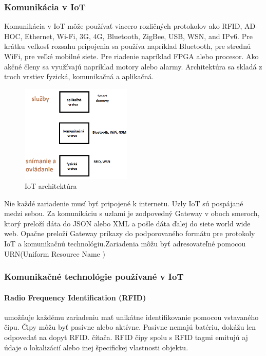 \documentclass[../../main.tex]{subfiles}
\begin{document}
\subsubsection{Komunikácia v IoT}
Komunikácia v IoT môže používať viacero rozličných protokolov ako RFID, AD-HOC, Ethernet, Wi-Fi, 3G, 4G, Bluetooth, ZigBee, USB, WSN, and IPv6. Pre krátku veľkosť rozsahu pripojenia sa používa napríklad Bluetooth, pre strednú WiFi, pre veľké mobilné siete.
Pre riadenie napríklad FPGA alebo procesor. Ako akčné členy sa využívajú napríklad motory alebo alarmy. Architektúra sa skladá z troch vrstiev fyzická, komunikačná a aplikačná. \cite{springerprofessional.de_The_Era_of_IoT} 

\begin{figure}
    \centering
  \includegraphics[width=0.47\textwidth]{images/IoT_vrstvy.png}
  \caption{IoT architektúra\cite{springerprofessional.de_The_Era_of_IoT}}
\end{figure} 
Nie každé zariadenie musí byť pripojené k internetu. Uzly IoT sú pospájané medzi sebou. Za komunikáciu s uzlami je zodpovedný Gateway v oboch smeroch, ktorý preloží dáta do JSON alebo XML a pošle dáta ďalej do siete world wide web. Opačne preloží Gateway príkazy do podporovaného formátu pre protokoly IoT  a komunikačnú technológiu.\cite{springerprofessional.de_The_Era_of_IoT}Zariadenia môžu byť adresovateľné pomocou URN(Uniform Resource Name )\cite{GUBBI20131645}
\subsubsection{Komunikačné technológie používané v IoT}
\paragraph{Radio Frequency Identification (RFID)} umožňuje každému zariadeniu mať unikátne identifikovanie pomocou vstavaného čipu. Čipy môžu byť pasívne alebo aktívne. Pasívne nemajú batériu, dokážu len odpovedať na dopyt RFID. čítača. \cite{GUBBI20131645} RFID čipy spolu s RFID tagmi emitujú aj údaje o lokalizácií alebo inej špecifickej vlastnosti objektu.
\end{document}

